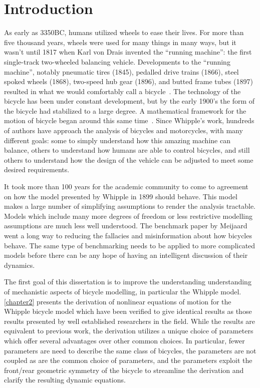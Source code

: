 \chapter{Introduction} \label{chapter1}
As early as 3350BC, humans utilized wheels to ease their lives. For more than
five thousand years, wheels were used for many things in many ways, but it
wasn't until 1817 when Karl von Drais invented the ``running machine'': the
first single-track two-wheeled balancing vehicle. Developments to the ``running
machine'', notably pneumatic tires (1845), pedalled drive trains (1866), steel
spoked wheels (1868), two-speed hub gear (1896), and butted frame tubes (1897)
resulted in what we would comfortably call a bicycle~\cite{Wilson2004}. The
technology of the bicycle has been under constant development, but by the early
1900's the form of the bicycle had stabilized to a large degree. A mathematical
framework for the motion of bicycle began around this same
time~\cite{Whipple1899}. Since Whipple's work, hundreds of authors have approach
the analysis of bicycles and motorcycles, with many different goals: some to
simply understand how this amazing machine can balance, others to understand
how humans are able to control bicycles, and still others to understand how the
design of the vehicle can be adjusted to meet some desired requirements.

It took more than 100 years for the academic community to come to agreement on
how the model presented by Whipple in 1899 should behave. This model makes a
large number of simplifying assumptions to render the analysis tractable.
Models which include many more degrees of freedom or less restrictive modelling
assumptions are much less well understood. The benchmark paper by
Meijaard~\cite{Meijaard2007} went a long way to reducing the fallacies and
misinformation about how bicycles behave. The same type of benchmarking needs
to be applied to more complicated models before there can be any hope of having
an intelligent discussion of their dynamics.

The first goal of this dissertation is to improve the understanding
understanding of mechanistic aspects of bicycle modelling, in particular the
Whipple model. \autoref{chapter2} presents the derivation of nonlinear
equations of motion for the Whipple bicycle model which have been verified to
give identical results as those results presented by well established
researchers in the field. While the results are equivalent to previous work,
the derivation utilizes a unique choice of parameters which offer several
advantages over other common choices.  In particular, fewer parameters are need
to describe the same class of bicycles, the parameters are not coupled as are
the common choice of parameters, and the parameters exploit the front/rear
geometric symmetry of the bicycle to streamline the derivation and clarify the
resulting dynamic equations.

